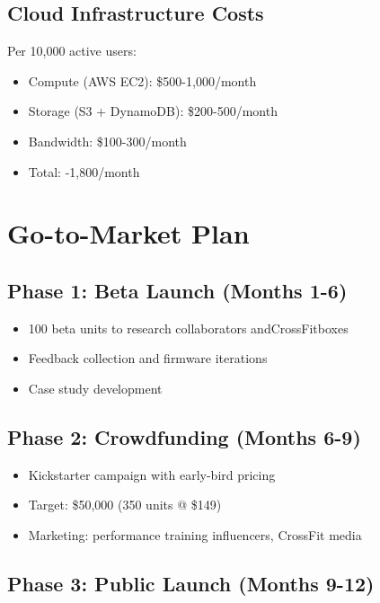 \subsection{Cloud Infrastructure Costs}

Per 10,000 active users:
\begin{itemize}
    \item Compute (AWS EC2): \$500-1,000/month
    \item Storage (S3 + DynamoDB): \$200-500/month
    \item Bandwidth: \$100-300/month
    \item Total: -1,800/month
\end{itemize}

\section{Go-to-Market Plan}

\subsection{Phase 1: Beta Launch (Months 1-6)}

\begin{itemize}
    \item 100 beta units to research collaborators andCrossFitboxes
    \item Feedback collection and firmware iterations
    \item Case study development
\end{itemize}

\subsection{Phase 2: Crowdfunding (Months 6-9)}

\begin{itemize}
    \item Kickstarter campaign with early-bird pricing
    \item Target: \$50,000 (350 units @ \$149)
    \item Marketing: performance training influencers, CrossFit media
\end{itemize}

\subsection{Phase 3: Public Launch (Months 9-12)}

